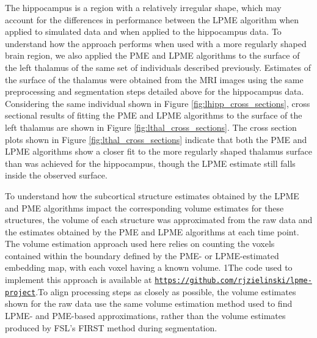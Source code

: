 \documentclass[12pt]{article}
\newcommand{\blind}{1}
\theoremstyle{definition}
\begin{document}
The hippocampus is a region with a relatively irregular shape, which may account for the differences in performance between the LPME algorithm when applied to simulated data and when applied to the hippocampus data. To understand how the approach performs when used with a more regularly shaped brain region, we also applied the PME and LPME algorithms to the surface of the left thalamus of the same set of individuals described previously. Estimates of the surface of the thalamus were obtained from the MRI images using the same preprocessing and segmentation steps detailed above for the hippocampus data. Considering the same individual shown in Figure \ref{fig:lhipp_cross_sections}, cross sectional results of fitting the PME and LPME algorithms to the surface of the left thalamus are shown in Figure \ref{fig:lthal_cross_sections}. The cross section plots shown in Figure \ref{fig:lthal_cross_sections} indicate that both the PME and LPME algorithms show a closer fit to the more regularly shaped thalamus surface than was achieved for the hippocampus, though the LPME estimate still falls inside the observed surface.

To understand how the subcortical structure estimates obtained by the LPME and PME algorithms impact the corresponding volume estimates for these structures, the volume of each structure was approximated from the raw data and the estimates obtained by the PME and LPME algorithms at each time point. The volume estimation approach used here relies on counting the voxels contained within the boundary defined by the PME- or LPME-estimated embedding map, with each voxel having a known volume. \blind{The code used to implement this approach is available at \href{https://github.com/rjzielinski/lpme-project}{\texttt{https://github.com/rjzielinski/lpme-project}}.}\fi To align processing steps as closely as possible, the volume estimates shown for the raw data use the same volume estimation method used to find LPME- and PME-based approximations, rather than the volume estimates produced by FSL's FIRST method during segmentation.
\end{document}
